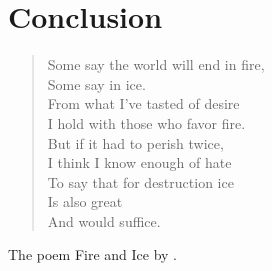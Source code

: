 \section{Conclusion}

\begin{verse}
    Some say the world will end in fire, \\
    \hspace{1cm}Some say in ice.\\
    From what I’ve tasted of desire \\
    I hold with those who favor fire.\\
    \hspace{1cm}But if it had to perish twice,\\
    I think I know enough of hate\\
    \hspace{1cm}To say that for destruction ice\\
    Is also great\\
    \hspace{1cm}And would suffice.
\end{verse}
The poem Fire and Ice by \citet{Frost1920}. 
